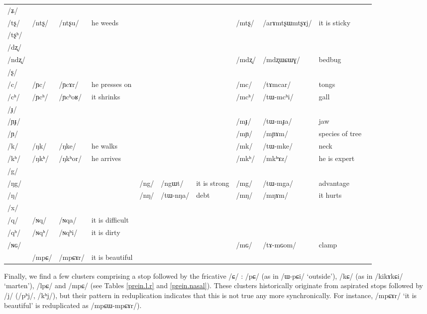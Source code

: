 \documentclass[oldfontcommands,oneside,a4paper,11pt]{article}
\newcommand{\ipa}[1]{/#1/} %
\newcommand{\deux}[1]{/#1/}
\newcommand{\trois}[1]{/#1/}
\begin{document}
\begin{table}
{\begin{tabular}{l|lll|lll|lll|l}
\ipa{ʑ} 	& 	& 	& 	& 	& 	& 	& 	& 	&  \\
\ipa{tʂ} 	& \deux{ntʂ} 	& \ipa{ntʂu} 	& he weeds	& 	& 	& 	& \deux{mtʂ} 	& \ipa{arɤmtʂɯmtʂɤj} 	& it is sticky \\
\ipa{tʂʰ} 	& 	& 	& 	& 	& 	& 	& 	& 	&  \\
\ipa{dʐ} 	& 	& 	& 	& 	& 	& 	& 	& 	&  \\
\ipa{ndʐ} 	& 	& 	& 	& 	& 	& 	& \deux{mdʐ} 	& \ipa{mdʐɯɕɯɣ} 	& bedbug \\
\ipa{ʂ} 	& 	& 	& 	& 	& 	& 	& 	& 	&  \\
\ipa{c} 	& \deux{ɲc} 	& \ipa{ɲcɤr} 	& he presses on	& 	& 	& 	& \deux{mc} 	& \ipa{tɤmcar} 	& tongs \\
\ipa{cʰ} 	& \deux{ɲcʰ} 	& \ipa{ɲcʰoʁ} 	& it shrinks	& 	& 	& 	& \deux{mcʰ} 	& \ipa{tɯ-mcʰi} 	& gall \\
\ipa{ɟ} 	& 	& 	& 	& 	& 	& 	& 	& 	&  \\
\ipa{ɲɟ} 	& 	& 	& 	& 	& 	& 	& \deux{mɟ} 	& \ipa{tɯ-mɟa} 	& jaw \\
\ipa{ɲ} 	& 	& 	& 	& 	& 	& 	& \deux{mɲ} 	& \ipa{mɲɤm} 	& species of tree \\
\ipa{k} 	& \deux{ŋk} 	& \ipa{ŋke} 	& he walks	& 	& 	& 	& \deux{mk} 	& \ipa{tɯ-mke} 	& neck \\
\ipa{kʰ} 	& \deux{ŋkʰ} 	& \ipa{ŋkʰor} 	&he arrives 	& 	& 	& 	& \deux{mkʰ} 	& \ipa{mkʰɤz} 	&he is expert  \\
\ipa{g} 	& 	& 	& 	& 	& 	& 	& 	& 	&  \\
\ipa{ŋg} 	& 	& 	& 	& \deux{ng} 	& \ipa{ngɯt} 	&it is strong 	& \deux{mg} 	& \ipa{tɯ-mga} 	& advantage \\
\ipa{ŋ} 	& 	& 	& 	& \deux{nŋ} 	& \ipa{tɯ-nŋa} 	& debt	& \deux{mŋ} 	& \ipa{mŋɤm} 	& it hurts \\
\ipa{x} 	& 	& 	& 	& 	& 	& 	& 	& 	&  \\
\ipa{q} 	&   \deux{ɴq} 	& \ipa{ɴqa} 	& it is difficult	& 	&  	&	&	&	&\\
\ipa{qʰ}   	&   \deux{ɴqʰ} 	& \ipa{ɴqʰi} 	& it is dirty	& 	&	& 	& 	& 	&\\
\ipa{ɴɢ}  	& 	&	&	& 	& 	& 	& \deux{mɢ} 	& \ipa{tɤ-mɢom} 	&clamp  \\
\midrule
&\trois{mpɕ} &\ipa{mpɕɤr} & it is beautiful\\
\end{tabular}}
\end{table}

Finally, we find a few clusters comprising a stop followed by the fricative \ipa{ɕ} :  \ipa{pɕ}  (as in \ipa{ɯ-pɕi}  `outside'),  \ipa{kɕ}  (as in \ipa{kikɤkɕi}  `marten'), \ipa{lpɕ} and \ipa{mpɕ} (see Tables \ref{prein.l.r} and  \ref{prein.nasal}). These clusters historically originate from aspirated stops followed by \ipa{j} (\ipa{pʰj}, \ipa{kʰj}), but their pattern in reduplication indicates that this is not true any more synchronically. For instance, \ipa{mpɕɤr} `it is beautiful' is reduplicated as \ipa{mpɕɯ-mpɕɤr}).
\end{document}
